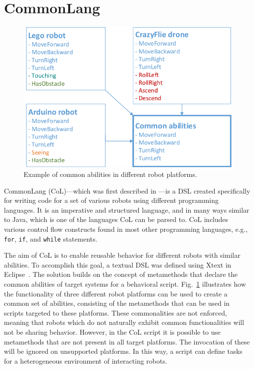 \documentclass[runningheads]{llncs}
\begin{document}
\section{CommonLang}


\begin{figure}[b]
	\centering
    \includegraphics[scale=0.65]{./images/commonlang.png}
    \caption{Example of common abilities in different robot platforms.}
    \label{fig:commonlang}
\end{figure}


CommonLang (CoL)---which was first described in \cite{gya17}---is a DSL created specifically for writing code for a set of various robots using different programming languages. 
It is an imperative and structured language, and in many ways similar to Java,
which is one of the languages CoL can be parsed to.
CoL includes various control flow constructs found in most other programming languages, e.g., \texttt{for}, \texttt{if}, and \texttt{while} statements.

The aim of CoL is to enable reusable behavior for different robots with similar abilities. 
To accomplish this goal, a textual DSL was defined using Xtext in Eclipse~\cite{xtext}.
The solution builds on the concept of metamethods that declare the common abilities of target systems for a behavioral script. 
Fig.~\ref{fig:commonlang} illustrates how the 
functionality of three different robot platforms can be used to create a common set
of abilities, consisting of the metamethods that can be used in scripts targeted to these platforms. 
These commonalities are not enforced, meaning that robots which do not naturally exhibit common functionalities will not be sharing behavior.
However, in the CoL script it is possible to use metamethods that are not present in all target platforms.
The invocation of these will be ignored on unsupported platforms.
In this way, a script can define tasks for a heterogeneous environment of interacting robots.
\end{document}
